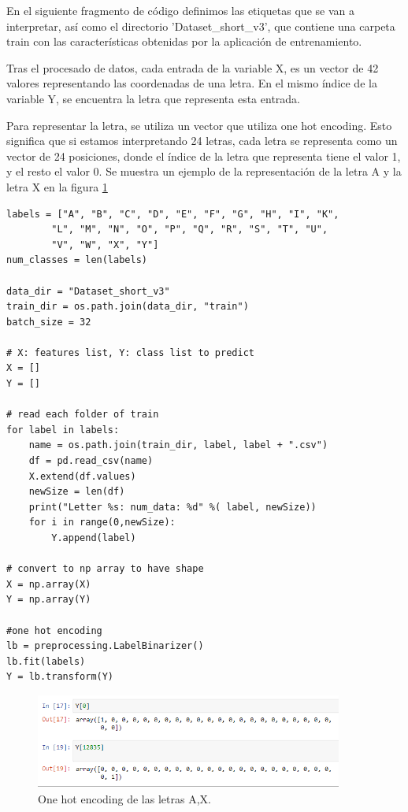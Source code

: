 \documentclass[../main.tex]{subfiles}
\begin{document}
En el siguiente  fragmento de código definimos las etiquetas que se van a interpretar, así como el directorio 'Dataset\_short\_v3', que contiene una carpeta train con las características obtenidas por la aplicación de entrenamiento. 

Tras el procesado de datos, cada entrada de la variable X, es un vector de 42 valores representando las coordenadas de una letra. En el mismo índice de la variable Y, se encuentra la letra que representa esta entrada.

Para representar la letra, se utiliza un vector que utiliza one hot encoding. Esto significa que si estamos interpretando 24 letras, cada letra se representa como un vector de 24 posiciones, donde el índice de la letra que representa tiene el valor 1, y el resto el valor 0. Se muestra un ejemplo de la representación de la letra A y la letra X en la figura \ref{figure14}

\begin{lstlisting}[style=stylepython]
labels = ["A", "B", "C", "D", "E", "F", "G", "H", "I", "K",
        "L", "M", "N", "O", "P", "Q", "R", "S", "T", "U",
        "V", "W", "X", "Y"]
num_classes = len(labels)

data_dir = "Dataset_short_v3"
train_dir = os.path.join(data_dir, "train")
batch_size = 32

# X: features list, Y: class list to predict
X = []
Y = []

# read each folder of train
for label in labels:
    name = os.path.join(train_dir, label, label + ".csv")
    df = pd.read_csv(name)
    X.extend(df.values)
    newSize = len(df)
    print("Letter %s: num_data: %d" %( label, newSize))
    for i in range(0,newSize):
        Y.append(label)
    
# convert to np array to have shape
X = np.array(X)
Y = np.array(Y)

#one hot encoding
lb = preprocessing.LabelBinarizer()
lb.fit(labels)
Y = lb.transform(Y)
\end{lstlisting}

\begin{figure}[h]
\centering 
\includegraphics[width=0.9\textwidth]{images/modelo/oneehotencoding.PNG}
\caption{One hot encoding de las letras A,X.}
\label{figure14}
\end{figure}
\end{document}
